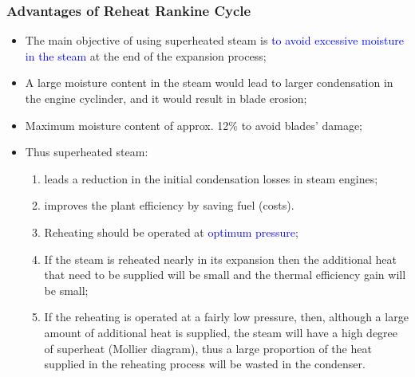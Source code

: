 \documentclass[10pt,compress]{beamer}
\begin{document}
\begin{frame}
 \frametitle{Advantages of Reheat Rankine Cycle}
  \begin{itemize}
   \item <1-> The main objective of using superheated steam is \textcolor{blue}{to avoid excessive moisture in the steam} at the end of the expansion process;
   \item <2-> A large moisture content in the steam would lead to larger condensation in the engine cyclinder, and it would result in blade erosion;
   \item <3-> Maximum moisture content of approx. 12$\%$ to avoid blades' damage;
   \item <4-> Thus superheated steam:
   \begin{enumerate}
    \item <5-> leads a reduction in the initial condensation losses in steam engines;
    \item <6-> improves the plant efficiency by saving fuel (costs).
    \item <7-> Reheating should be operated at \textcolor{blue}{optimum pressure};
    \item <8-> If the steam is reheated nearly in its expansion then the additional heat that need to be supplied will be small and the thermal efficiency gain will be small;
    \item <9-> If the reheating is operated at a fairly low pressure, then, although a large amount of additional heat is supplied, the steam will have a high degree of superheat (Mollier diagram), thus a large proportion of the heat supplied in the reheating process will be wasted in the condenser.
   \end{enumerate}
  \end{itemize}
 
\end{frame}
\end{document}
